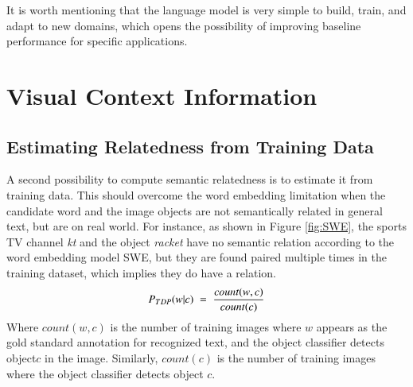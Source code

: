 \documentclass[phd,tocprelim]{cornell}
\begin{document}
It is worth mentioning that the language model is very simple to build, train, and adapt to new domains, which opens the possibility of improving baseline performance for specific applications.  

\section{Visual Context Information} 
\subsection{Estimating Relatedness from Training Data}



A second possibility to compute semantic relatedness is to estimate it from training data. This should overcome the word embedding limitation when the candidate word and the image objects are not semantically related in general text, but are on real world. For instance, as shown in  Figure \ref{fig:SWE}, the sports TV channel \textit{kt} and the object \textit{racket} have no semantic relation according to the word embedding model SWE, but they are found paired multiple times in the training dataset,  which implies they do have a relation.  %
\begin{equation}
\small P_{TDP}(w\vert c)\;=\;\frac{count(w,c)}{count(c)}
\end{equation}
Where $count(w,c)$ is the number of training images where $w$ appears as the gold standard annotation for recognized text, and the object classifier detects object$c$ in the image. Similarly, $count(c)$ is the number of training images where the object classifier detects object $c$.  
\end{document}
